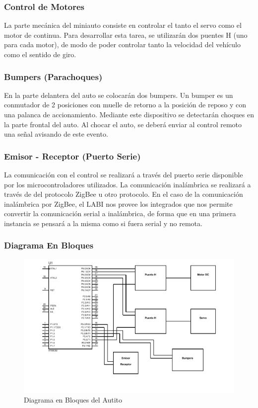 \documentclass[a4paper,10pt]{article}
\begin{document}
			\subsubsection{Control de Motores}
				La parte mecánica del miniauto consiste en controlar el tanto el servo como el motor de continua. Para desarrollar esta tarea, se utilizarán dos
				puentes H (uno para cada motor), de modo de poder controlar tanto la velocidad del vehículo como el sentido de giro.  
			\subsubsection{Bumpers (Parachoques)}
				En la parte delantera del auto se colocarán dos bumpers. Un bumper es un conmutador de 2 posiciones con muelle de retorno a la posición de reposo
				y con una palanca de accionamiento. Mediante este dispositivo se detectarán choques en la parte frontal del auto. Al chocar el auto, se deberá
				enviar al control remoto una señal avisando de este evento. 
			\subsubsection{Emisor - Receptor (Puerto Serie)}
				La comunicación con el control se realizará a través del puerto serie disponible por los microcontroladores utilizados. La comunicación inalámbrica
				se realizará a través de del protocolo ZigBee u otro protocolo. En el caso de la comunicación inalámbrica por ZigBee, el LABI nos provee los 
				integrados que nos permite convertir la comunicación serial a inalámbrica, de forma que en una primera instancia se pensará a la misma como si fuera
				serial y no remota.
			\subsubsection{Diagrama En Bloques}
				\begin{figure}[!htb]
						\includegraphics[width=13cm]{Imagenes/DiagramaAutito.pdf}
						\caption{Diagrama en Bloques del Autito} \label{img001}
					\end{figure}
				
\end{document}
